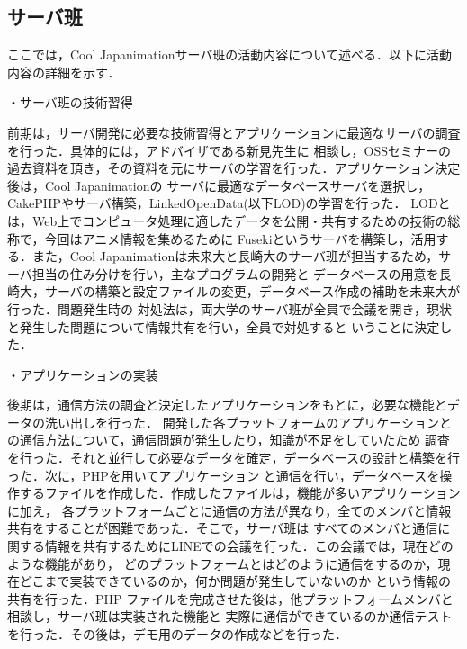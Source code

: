 \subsection{サーバ班}
\par
ここでは，Cool Japanimationサーバ班の活動内容について述べる．以下に活動内容の詳細を示す．
\par
・サーバ班の技術習得
\par
前期は，サーバ開発に必要な技術習得とアプリケーションに最適なサーバの調査を行った．具体的には，アドバイザである新見先生に
相談し，OSSセミナーの過去資料を頂き，その資料を元にサーバの学習を行った．アプリケーション決定後は，Cool Japanimationの
サーバに最適なデータベースサーバを選択し，CakePHPやサーバ構築，LinkedOpenData(以下LOD)の学習を行った．
LODとは，Web上でコンピュータ処理に適したデータを公開・共有するための技術の総称で，今回はアニメ情報を集めるために
Fusekiというサーバを構築し，活用する．また，Cool Japanimationは未来大と長崎大のサーバ班が担当するため，サーバ担当の住み分けを行い，主なプログラムの開発と
データベースの用意を長崎大，サーバの構築と設定ファイルの変更，データベース作成の補助を未来大が行った．問題発生時の
対処法は，両大学のサーバ班が全員で会議を開き，現状と発生した問題について情報共有を行い，全員で対処すると
いうことに決定した．
\par
・アプリケーションの実装
\par
後期は，通信方法の調査と決定したアプリケーションをもとに，必要な機能とデータの洗い出しを行った．
開発した各プラットフォームのアプリケーションとの通信方法について，通信問題が発生したり，知識が不足をしていたため
調査を行った．それと並行して必要なデータを確定，データベースの設計と構築を行った．次に，PHPを用いてアプリケーション
と通信を行い，データベースを操作するファイルを作成した．作成したファイルは，機能が多いアプリケーションに加え，
各プラットフォームごとに通信の方法が異なり，全てのメンバと情報共有をすることが困難であった．そこで，サーバ班は
すべてのメンバと通信に関する情報を共有するためにLINEでの会議を行った．この会議では，現在どのような機能があり，
どのプラットフォームとはどのように通信をするのか，現在どこまで実装できているのか，何か問題が発生していないのか
という情報の共有を行った．PHP ファイルを完成させた後は，他プラットフォームメンバと相談し，サーバ班は実装された機能と
実際に通信ができているのか通信テストを行った．その後は，デモ用のデータの作成などを行った．



